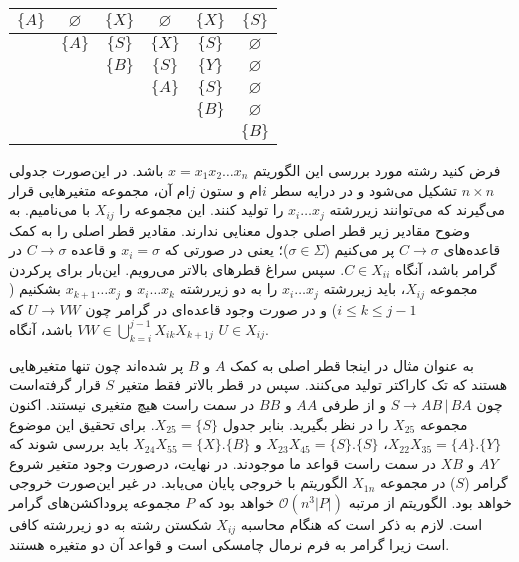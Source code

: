 \documentclass[main.tex]{subfiles}
\begin{document}
\begin{example}
\setLTR
			\begin{center}
			\begin{tabular}{|c|c|c|c|c|c|}
				\hline
				$\{A\}$ & $\varnothing$ & $\{X\}$ & $\varnothing$ & $\{X\}$ & $\{S\}$ \\
				\hline
				 & $\{A\}$ & $\{S\}$ & $\{X\}$ & $\{S\}$ & $\varnothing$ \\
				\hline
				 &  & $\{B\}$ & $\{S\}$ & $\{Y\}$ & $\varnothing$ \\
				\hline
				 & & & $\{A\}$ & $\{S\}$ & $\varnothing$ \\
				\hline
				 &  &  &  & $\{B\}$ & $\varnothing$ \\
				\hline
				 &  & &  &  & $\{B\}$ \\
				\hline
			\end{tabular}
		\end{center}
\setRTL
فرض کنید رشته مورد بررسی این الگوریتم 
	$x = x_1x_2\dots x_n$
	باشد. در این‌صورت جدولی $n \times n$ تشکیل می‌شود و در درایه سطر $i$ام و ستون $j$ام آن، مجموعه متغیرهایی قرار می‌گیرند که می‌توانند زیررشته 
	$x_i\dots x_j$
	را تولید کنند. این مجموعه را 
	$X_{ij}$
	با می‌نامیم. به وضوح مقادیر زیر قطر اصلی جدول معنایی ندارند. مقادیر قطر اصلی را به کمک قاعده‌های 
	$C \rightarrow \sigma$
	 پر می‌کنیم
	 ($\sigma \in \Sigma$)؛
یعنی در صورتی که 
	$x_i = \sigma$
	و قاعده 
	$C \rightarrow \sigma$
	در گرامر باشد، آنگاه  
	$C \in X_{ii}$.
	 سپس سراغ قطرهای بالاتر می‌رویم. این‌بار برای پرکردن مجموعه 
	$X_{ij}$،
	 باید زیررشته 
	$x_i\dots x_j$
	را به دو زیررشته 
	$x_i\dots x_k$
	و
	$x_{k+1}\dots x_j$
	بشکنیم 
	($i \leq k \leq j - 1$)
	و در صورت وجود قاعده‌ای در گرامر چون
	$U \rightarrow VW$
	که 
	$VW \in \bigcup\limits_{k = i}^{j - 1} X_{ik}X_{k+1j}$
	باشد، آنگاه 
	$U \in X_{ij}$. 
	
	به عنوان مثال در اینجا قطر اصلی به کمک 
	$A$
	و
	$B$ 
	پر شده‌اند چون تنها متغیرهایی هستند که تک کاراکتر تولید می‌کنند. سپس در قطر بالاتر فقط متغیر $S$ قرار گرفته‌است چون 
	$S \rightarrow AB \, | \, BA$ 
	و از طرفی
	$AA$ 
	و
	$BB$
	در سمت راست هیچ متغیری نیستند. اکنون مجموعه
	$X_{25}$
	را در نظر بگیرید. بنابر جدول
	$X_{25} = \{S\}$.
	برای تحقیق این موضوع 
	$X_{22}X_{35} = \{A\}.\{Y\}$،
	$X_{23}X_{45} = \{S\}.\{S\}$
	و
	$X_{24}X_{55} = \{X\}.\{B\}$
	باید بررسی شوند که $AY$ و $XB$ در سمت راست قواعد ما موجودند. در نهایت، درصورت وجود متغیر شروع گرامر ($S$) در مجموعه 
	$X_{1n}$
	الگوریتم با خروجی 
	پایان می‌یابد. در غیر این‌صورت خروجی
	  خواهد بود. الگوریتم از مرتبه
	 $ \mathcal{O}(n^3|P|)$
	 خواهد بود که $P$ مجموعه پروداکشن‌های گرامر است. لازم به ذکر است که هنگام محاسبه 
	 $X_{ij}$
	 شکستن رشته به دو زیررشته کافی است زیرا گرامر به فرم نرمال چامسکی است و قواعد آن دو متغیره هستند.


\end{example}
\end{document}
